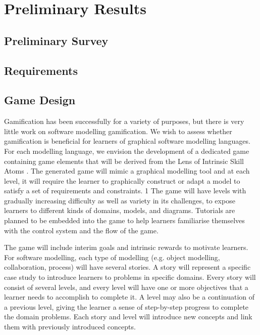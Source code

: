 \documentclass[a4paper]{Report}
\begin{document}
\chapter{Preliminary Results}

\section{Preliminary Survey}


\section{Requirements}


\section{Game Design}
Gamification has been successfully for a variety of purposes, but there is very little work on software modelling gamification. We wish to assess whether gamification is beneficial for learners of graphical software modelling languages. For each modelling language, we envision the development of a dedicated game containing game elements that will be derived from the Lens of Intrinsic Skill Atoms \cite{deterding2015lens}. The generated game will mimic a graphical modelling tool and at each level, it will require the learner to graphically construct or adapt a model to satisfy a set of requirements and constraints.
	1
The game will have levels with gradually increasing difficulty as well as variety in its challenges, to expose learners to different kinds of domains, models, and diagrams. Tutorials are planned to be embedded into the game to help learners familiarise themselves with the control system and the flow of the game. 

The game will include interim goals and intrinsic rewards to motivate learners. For software modelling, each type of modelling (e.g. object modelling, collaboration, process) will have several stories. A story will represent a specific case study to introduce learners to problems in specific domains. Every story will consist of several levels, and every level will have one or more objectives that a learner needs to accomplish to complete it. A level may also be a continuation of a previous level, giving the learner a sense of step-by-step progress to complete the domain problems. Each story and level will introduce new concepts and link them with previously introduced concepts.
\end{document}
